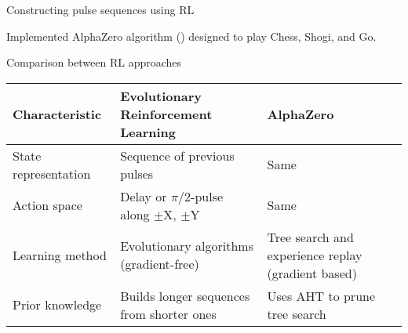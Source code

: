 \documentclass{beamer}
\begin{document}
\begin{frame}{Constructing pulse sequences using RL}

Implemented AlphaZero algorithm (\cite{Silver1140}) designed to play Chess, Shogi, and Go.

\begin{figure}
\centering
\scalebox{.75}{

}
\end{figure}


\end{frame}


\begin{frame}{Comparison between RL approaches}

\begin{tabular}{p{} p{} p{}}
    Characteristic & Evolutionary Reinforcement Learning & AlphaZero \\
    \hline
    State representation & Sequence of previous pulses & Same \\
    Action space & Delay or $\pi/2$-pulse along $\pm$X, $\pm$Y & Same \\
    Learning method & Evolutionary algorithms (gradient-free) & Tree search and experience replay (gradient based) \\
    Prior knowledge & Builds longer sequences from shorter ones & Uses AHT to prune tree search
\end{tabular}

\end{frame}
\end{document}
